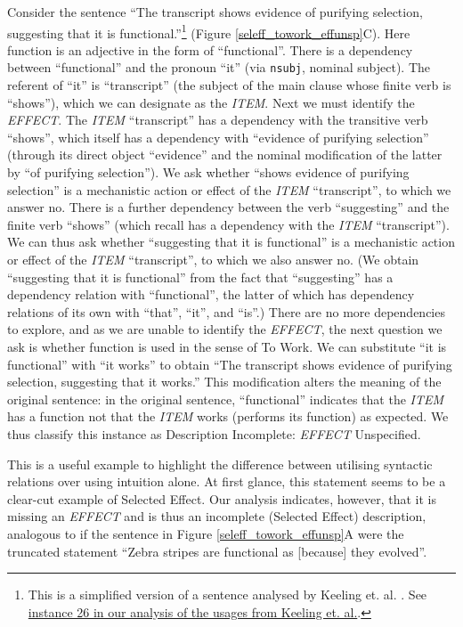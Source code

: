 \documentclass{article}
\begin{document}
Consider the sentence ``The transcript shows evidence of purifying selection, suggesting that it is functional.''\footnote{This is a simplified version of a sentence analysed by Keeling et. al. \cite{keeling2019}. See \href{https://joshuachristie.github.io/function-concepts/examples_Keeling_et_al_2019.html}{instance 26 in our analysis of the usages from Keeling et. al.}.} (Figure \ref{seleff_towork_effunsp}C).
Here function is an adjective in the form of ``functional''.
There is a dependency between ``functional'' and the pronoun ``it'' (via \texttt{nsubj}, nominal subject).
The referent of ``it'' is ``transcript'' (the subject of the main clause whose finite verb is ``shows''), which we can designate as the \emph{ITEM}.
Next we must identify the \emph{EFFECT}.
The \emph{ITEM} ``transcript'' has a dependency with the transitive verb ``shows'', which itself has a dependency with ``evidence of purifying selection'' (through its direct object ``evidence'' and the nominal modification of the latter by ``of purifying selection'').
We ask whether ``shows evidence of purifying selection'' is a mechanistic action or effect of the \emph{ITEM} ``transcript'', to which we answer no.
There is a further dependency between the verb ``suggesting'' and the finite verb ``shows'' (which recall has a dependency with the \emph{ITEM} ``transcript'').
We can thus ask whether ``suggesting that it is functional'' is a mechanistic action or effect of the \emph{ITEM} ``transcript'', to which we also answer no.
(We obtain ``suggesting that it is functional'' from the fact that ``suggesting'' has a dependency relation with ``functional'', the latter of which has dependency relations of its own with ``that'', ``it'', and ``is''.)
There are no more dependencies to explore, and as we are unable to identify the \emph{EFFECT}, the next question we ask is whether function is used in the sense of To Work.
We can substitute ``it is functional'' with ``it works'' to obtain ``The transcript shows evidence of purifying selection, suggesting that it works.''
This modification alters the meaning of the original sentence: in the original sentence, ``functional'' indicates that the \emph{ITEM} has a function not that the \emph{ITEM} works (performs its function) as expected.
We thus classify this instance as Description Incomplete: \emph{EFFECT} Unspecified.

This is a useful example to highlight the difference between utilising syntactic relations over using intuition alone.
At first glance, this statement seems to be a clear-cut example of Selected Effect.
Our analysis indicates, however, that it is missing an \emph{EFFECT} and is thus an incomplete (Selected Effect) description, analogous to if the sentence in Figure \ref{seleff_towork_effunsp}A were the truncated statement ``Zebra stripes are functional as [because] they evolved''.
\end{document}
